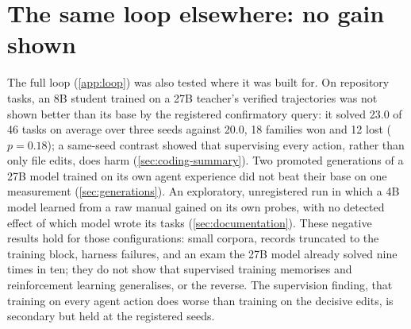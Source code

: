 
\section{The same loop elsewhere: no gain shown}\label{sec:elsewhere}

The full loop (\cref{app:loop}) was also tested where it was built for. On repository tasks, an 8B
student trained on a 27B teacher's verified trajectories was not shown better than its base by the
registered confirmatory query: it solved 23.0 of 46 tasks on average over three seeds against 20.0, 18
families won and 12 lost ($p=0.18$); a same-seed contrast showed that supervising every action, rather
than only file edits, does harm (\cref{sec:coding-summary}). Two promoted generations of a
27B model trained on its own agent experience did not beat their base on one measurement
(\cref{sec:generations}). An exploratory, unregistered run in which a 4B model learned
from a raw manual gained on its own probes, with no detected effect of which model wrote its tasks
(\cref{sec:documentation}). These negative results hold for those configurations: small
corpora, records truncated to the training block, harness failures, and an exam the 27B model already
solved nine times in ten; they do not show that supervised training memorises and reinforcement learning
generalises, or the reverse. The supervision finding, that training on every agent action does worse than
training on the decisive edits, is secondary but held at the registered seeds.
